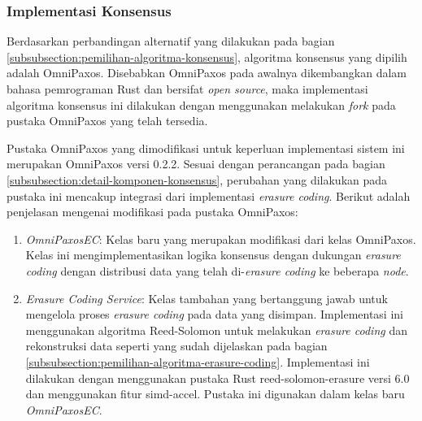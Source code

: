 \subsubsection{Implementasi Konsensus}
\label{subsubsection:implementasi-konsensus}

Berdasarkan perbandingan alternatif yang dilakukan pada bagian \ref{subsubsection:pemilihan-algoritma-konsensus}, algoritma konsensus yang dipilih adalah OmniPaxos. Disebabkan OmniPaxos pada awalnya dikembangkan dalam bahasa pemrograman Rust dan bersifat \textit{open source}, maka implementasi algoritma konsensus ini dilakukan dengan menggunakan melakukan \textit{fork} pada pustaka OmniPaxos yang telah tersedia.

Pustaka OmniPaxos yang dimodifikasi untuk keperluan implementasi sistem ini merupakan OmniPaxos versi 0.2.2. Sesuai dengan perancangan pada bagian \ref{subsubsection:detail-komponen-konsensus}, perubahan yang dilakukan pada pustaka ini mencakup integrasi dari implementasi \textit{erasure coding}. Berikut adalah penjelasan mengenai modifikasi pada pustaka OmniPaxos:

\begin{enumerate}
  \item \textit{OmniPaxosEC}: Kelas baru yang merupakan modifikasi dari kelas OmniPaxos. Kelas ini mengimplementasikan logika konsensus dengan dukungan \textit{erasure coding} dengan distribusi data yang telah di-\textit{erasure coding} ke beberapa \textit{node}. 
  \item \textit{Erasure Coding Service}: Kelas tambahan yang bertanggung jawab untuk mengelola proses \textit{erasure coding} pada data yang disimpan. Implementasi ini menggunakan algoritma Reed-Solomon untuk melakukan \textit{erasure coding} dan rekonstruksi data seperti yang sudah dijelaskan pada bagian \ref{subsubsection:pemilihan-algoritma-erasure-coding}. Implementasi ini dilakukan dengan menggunakan pustaka Rust reed-solomon-erasure versi 6.0 dan menggunakan fitur simd-accel. Pustaka ini digunakan dalam kelas baru \textit{OmniPaxosEC}.
\end{enumerate}

